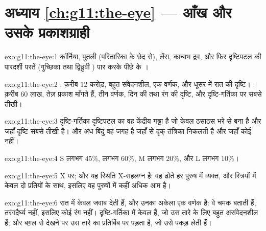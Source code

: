 \section*{अध्याय \ref{ch:g11:the-eye} --- आँख और उसके प्रकाशग्राही}

\begin{solution}{exo:g11:the-eye:1}
कॉर्निया, पुतली (परितारिका के छेद से), लेंस, काचाभ द्रव, और फिर दृष्टिपटल
की पारदर्शी परतें (गुच्छिका तथा द्विध्रुवी ) पार करके पीछे के
।
\end{solution}

\begin{solution}{exo:g11:the-eye:2}
: क़रीब 12 करोड़, बहुत संवेदनशील, एक वर्णक, और धूसर में रात की
दृष्टि। : क़रीब 60 लाख, तेज़ प्रकाश माँगते हैं, तीन वर्णक, दिन की तथा
रंग की दृष्टि, और दृष्टि-गर्तिका पर सबसे तीखी।
\end{solution}

\begin{solution}{exo:g11:the-eye:3}
दृष्टि-गर्तिका दृष्टिपटल का वह केंद्रीय गड्ढा है जो केवल ठसाठस भरे 
से बना है और जहाँ दृष्टि सबसे तीखी है। और अंध बिंदु वह जगह है जहाँ से दृक्
तंत्रिका निकलती है और जहाँ कोई  नहीं।
\end{solution}

\begin{solution}{exo:g11:the-eye:4}
S  लगभग 45\%,  लगभग 60\%, M  लगभग 20\%, और L  लगभग
10\%।
\end{solution}

\begin{solution}{exo:g11:the-eye:5}
X  पर; और यह स्थिति X-सहलग्न  है: वह  ढोते हर पुरुष
में व्यक्त, और स्त्रियों में केवल दो प्रतियों के साथ, इसलिए वह पुरुषों में
कहीं अधिक आम है।
\end{solution}

\begin{solution}{exo:g11:the-eye:6}
रात में केवल  जवाब देती हैं, और उनका अकेला एक वर्णक है: वे चमक बताती
हैं, तरंगदैर्घ्य नहीं, इसलिए कोई रंग नहीं। दृष्टि-गर्तिका में केवल 
हैं, जो उस तारे के लिए बहुत असंवेदनशील हैं; और बग़ल से देखने पर उस तारे का
प्रतिबिंब  पर पड़ता है, जो उसे पकड़ लेती हैं।
\end{solution}

